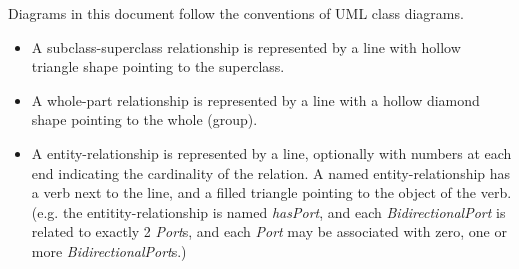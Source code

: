 Diagrams in this document follow the conventions of UML class diagrams.
\begin{itemize}
\item A subclass-superclass relationship is represented by a line with hollow triangle shape pointing to the superclass.
\item A whole-part relationship is represented by a line with a hollow diamond shape pointing to the whole (group).
\item A entity-relationship is represented by a line, optionally with numbers at each end indicating the cardinality of the relation. A named entity-relationship has a verb next to the line, and a filled triangle pointing to the object of the verb. (e.g. the entitity-relationship
 is named \emph{hasPort}, and each \emph{BidirectionalPort} is related to exactly 2 \emph{Port}s, and each \emph{Port} may be associated with zero, one or more \emph{BidirectionalPort}s.)
\end{itemize}

